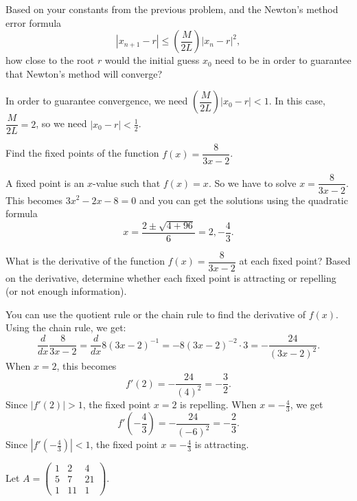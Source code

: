 \documentclass[11pt,answers]{exam}
\begin{document}
\begin{questions}
\question Based on your constants from the previous problem, and the Newton's method error formula 
$$|x_{n+1} - r| \le \left( \frac{M}{2L} \right) |x_n - r|^2,$$
how close to the root $r$ would the initial guess $x_0$ need to be in order to guarantee that Newton's method will converge?  
\begin{solution}
In order to guarantee convergence, we need $\left( \dfrac{M}{2L} \right) |x_0 - r| < 1$.  In this case, $\dfrac{M}{2L} = 2$, so we need $|x_0-r| < \frac{1}{2}$. %
\end{solution}


\question Find the fixed points of the function $f(x) = \dfrac{8}{3x-2}$.  
\begin{solution}
A fixed point is an $x$-value such that $f(x) = x$.  So we have to solve $x = \dfrac{8}{3x-2}$.  This becomes $3x^2 - 2x - 8 = 0$ and you can get the solutions using the quadratic formula
$$x = \frac{2 \pm \sqrt{4 + 96}}{6} = 2, -\frac{4}{3}.$$
\end{solution}

\question What is the derivative of the function $f(x) = \dfrac{8}{3x-2}$ at each fixed point?  Based on the derivative, determine whether each fixed point is attracting or repelling (or not enough information).  

\begin{solution}
You can use the quotient rule or the chain rule to find the derivative of $f(x)$.  Using the chain rule, we get:
$$\frac{d}{dx} \dfrac{8}{3x-2} = \frac{d}{dx} 8 (3x-2)^{-1} = -8 (3x-2)^{-2} \cdot 3 = -\frac{24}{(3x-2)^2}.$$
When $x=2$, this becomes
$$f'(2) = -\frac{24}{(4)^2} = -\frac{3}{2}.$$
Since $|f'(2)| > 1$, the fixed point $x=2$ is repelling.
When $x=-\frac{4}{3}$, we get
$$f'(-\frac{4}{3}) = -\frac{24}{(-6)^2} = -\frac{2}{3}.$$
Since $|f'(-\frac{4}{3})| < 1$, the fixed point $x=-\frac{4}{3}$ is attracting. 
\end{solution}

\question Let $A = \begin{pmatrix} 1 & 2 & 4 \\ 5 & 7 & 21 \\ 1 & 11 & 1 \end{pmatrix}.$
\begin{parts}

\end{parts}
\end{questions}
\end{document}
